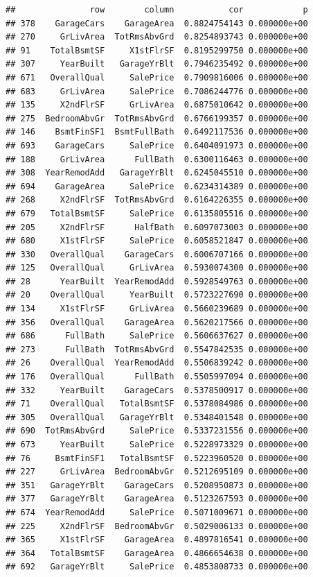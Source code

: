 \documentclass[american,]{article}
\theoremstyle{definition}
\theoremstyle{definition}
\theoremstyle{definition}
\theoremstyle{remark}
\begin{document}
\begin{verbatim}
##               row        column           cor            p
## 378    GarageCars    GarageArea  0.8824754143 0.000000e+00
## 270     GrLivArea  TotRmsAbvGrd  0.8254893743 0.000000e+00
## 91    TotalBsmtSF     X1stFlrSF  0.8195299750 0.000000e+00
## 307     YearBuilt   GarageYrBlt  0.7946235492 0.000000e+00
## 671   OverallQual     SalePrice  0.7909816006 0.000000e+00
## 683     GrLivArea     SalePrice  0.7086244776 0.000000e+00
## 135     X2ndFlrSF     GrLivArea  0.6875010642 0.000000e+00
## 275  BedroomAbvGr  TotRmsAbvGrd  0.6766199357 0.000000e+00
## 146    BsmtFinSF1  BsmtFullBath  0.6492117536 0.000000e+00
## 693    GarageCars     SalePrice  0.6404091973 0.000000e+00
## 188     GrLivArea      FullBath  0.6300116463 0.000000e+00
## 308  YearRemodAdd   GarageYrBlt  0.6245045510 0.000000e+00
## 694    GarageArea     SalePrice  0.6234314389 0.000000e+00
## 268     X2ndFlrSF  TotRmsAbvGrd  0.6164226355 0.000000e+00
## 679   TotalBsmtSF     SalePrice  0.6135805516 0.000000e+00
## 205     X2ndFlrSF      HalfBath  0.6097073003 0.000000e+00
## 680     X1stFlrSF     SalePrice  0.6058521847 0.000000e+00
## 330   OverallQual    GarageCars  0.6006707166 0.000000e+00
## 125   OverallQual     GrLivArea  0.5930074300 0.000000e+00
## 28      YearBuilt  YearRemodAdd  0.5928549763 0.000000e+00
## 20    OverallQual     YearBuilt  0.5723227690 0.000000e+00
## 134     X1stFlrSF     GrLivArea  0.5660239689 0.000000e+00
## 356   OverallQual    GarageArea  0.5620217566 0.000000e+00
## 686      FullBath     SalePrice  0.5606637627 0.000000e+00
## 273      FullBath  TotRmsAbvGrd  0.5547842535 0.000000e+00
## 26    OverallQual  YearRemodAdd  0.5506839242 0.000000e+00
## 176   OverallQual      FullBath  0.5505997094 0.000000e+00
## 332     YearBuilt    GarageCars  0.5378500917 0.000000e+00
## 71    OverallQual   TotalBsmtSF  0.5378084986 0.000000e+00
## 305   OverallQual   GarageYrBlt  0.5348401548 0.000000e+00
## 690  TotRmsAbvGrd     SalePrice  0.5337231556 0.000000e+00
## 673     YearBuilt     SalePrice  0.5228973329 0.000000e+00
## 76     BsmtFinSF1   TotalBsmtSF  0.5223960520 0.000000e+00
## 227     GrLivArea  BedroomAbvGr  0.5212695109 0.000000e+00
## 351   GarageYrBlt    GarageCars  0.5208950873 0.000000e+00
## 377   GarageYrBlt    GarageArea  0.5123267593 0.000000e+00
## 674  YearRemodAdd     SalePrice  0.5071009671 0.000000e+00
## 225     X2ndFlrSF  BedroomAbvGr  0.5029006133 0.000000e+00
## 365     X1stFlrSF    GarageArea  0.4897816541 0.000000e+00
## 364   TotalBsmtSF    GarageArea  0.4866654638 0.000000e+00
## 692   GarageYrBlt     SalePrice  0.4853808733 0.000000e+00

\end{verbatim}
\end{document}

